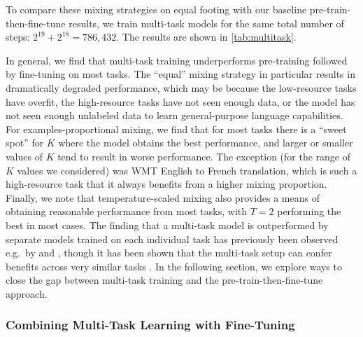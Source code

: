 To compare these mixing strategies on equal footing with our baseline pre-train-then-fine-tune results, we train multi-task models for the same total number of steps: $2^{19} + 2^{18} = 786{,}432$. The results are shown in \ref{tab:multitask}.

In general, we find that multi-task training underperforms pre-training followed by fine-tuning on most tasks. The ``equal'' mixing strategy in particular results in dramatically degraded performance, which may be because the low-resource tasks have overfit, the high-resource tasks have not seen enough data, or the model has not seen enough unlabeled data to learn general-purpose language capabilities. For examples-proportional mixing, we find that for most tasks there is a ``sweet spot'' for $K$ where the model obtains the best performance, and larger or smaller values of $K$ tend to result in worse performance. The exception (for the range of $K$ values we considered) was WMT English to French translation, which is such a high-resource task that it always benefits from a higher mixing proportion. Finally, we note that temperature-scaled mixing also provides a means of obtaining reasonable performance from most tasks, with $T = 2$ performing the best in most cases. The finding that a multi-task model is outperformed by separate models trained on each individual task has previously been observed e.g.\ by \citet{arivazhagan2019massively} and \citet{mccann2018natural}, though it has been shown that the multi-task setup can confer benefits across very similar tasks \cite{liu2019multi,ratner2018snorkel}. In the following section, we explore ways to close the gap between multi-task training and the pre-train-then-fine-tune approach.

\subsubsection{Combining Multi-Task Learning with Fine-Tuning}
\label{sec:mtft}

